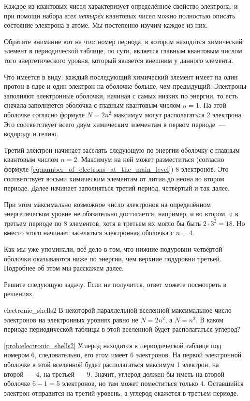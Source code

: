 Каждое из квантовых чисел характеризует определённое свойство электрона, и при помощи набора \emph{всех четырёх} квантовых чисел можно полностью описать состояние электрона в атоме. Мы постепенно изучим каждое из них.

Обратите внимание вот на что: номер периода, в котором находится химический элемент в периодической таблице, по сути, является главным квантовым числом того энергетического уровня, который является внешним у данного элемента.

Что имеется в виду: каждый последующий химический элемент имеет на один протон в ядре и один электрон на оболочке больше, чем предыдущий. Электроны заполняют электронные оболочки, начиная с самых низких по энергии, то есть сначала заполняется оболочка с главным квантовым числом $n = 1$. На этой оболочке согласно формуле $N = 2n^2$ максимум могут располагаться 2 электрона. Это соответствует всего двум химическим элементам в первом периоде~--- водороду и гелию.

Третий электрон начинает заселять следующую по энергии оболочку с главным квантовым числом $n = 2$. Максимум на ней может разместиться (согласно формуле \ref{eq:number_of_electrons_at_the_main_level}) 8 электронов. Это соответствует восьми химическим элементам от лития до неона во втором периоде. Далее начинает заполняться третий период, четвёртый и так далее.

При этом максимально возможное число электронов на определённом энергетическом уровне не обязательно достигается, например, и во втором, и в третьем периоде по 8 элементов, хотя в третьем их могло бы быть $2 \cdot 3^2 = 18$. Но вместо этого начинает заселяться электронная оболочка с $n = 4$.

Как мы уже упоминали, всё дело в том, что нижние подуровни четвёртой оболочки оказываются ниже по энергии, чем верхние подуровни третьей. Подробнее об этом мы расскажем далее.

Решите следующую задачу. Если не получится, ответ можете посмотреть в \hyperref[sec:solutions]{решениях}.

\begin{problem}{}{electronic_shells2}
    В некоторой параллельной вселенной максимальное число электронов на электронных уровнях равно не $N = 2n^2$, а $N = n^2$. В каком периоде периодической таблицы в этой вселенной будет располагаться углерод?
    \begin{sol}{\ref{prob:electronic_shells2}}
        Углерод находится в периодической таблице под номером 6, следовательно, его атом имеет 6 электронов. На первой электронной оболочке в этой вселенной будет располагаться максимум 1 электрон, на второй~--- 4, на третьей~--- 9. Значит, углерод должен бы иметь на второй оболочке $6 - 1 = 5$ электронов, но там может поместиться только 4. Оставшийся электрон отправится на третий уровень, а углерод окажется в третьем периоде.
    \end{sol}
\end{problem}

